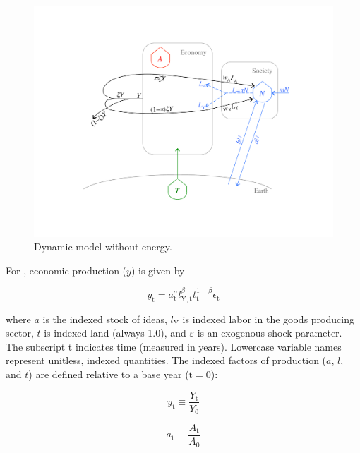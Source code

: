\documentclass[letterpaper,12pt]{article}
\begin{document}
\begin{figure} \label{fig:ModelWithoutEnergy}
  \begin{center}
    \includegraphics[width=\textwidth]{figure_other/ModelWithoutEnergy.pdf}
    \caption{Dynamic model without energy.}
  \end{center}
\end{figure}

For \citet{Jones:2001wn}, economic production ($y$) is given by

\begin{equation} \label{eq:Jones_production_function}
	y_\mathrm{t} = a_\mathrm{t} ^\sigma l_\mathrm{Y,t} ^\beta t_\mathrm{t} ^{1-\beta} \epsilon_\mathrm{t}
\end{equation}

\noindent where $a$ is the indexed stock of ideas, $l_\mathrm{Y}$ is indexed labor in the goods producing sector, $t$ is indexed land (always 1.0), and $\varepsilon$ is an exogenous shock parameter. The subscript t indicates time (measured in years). Lowercase variable names represent unitless, indexed quantities. The indexed factors of production ($a$, $l$, and $t$) are defined relative to a base year ($\mathrm{t} = 0$):

\begin{equation} \label{eq:index_y}
	y_\mathrm{t} \equiv \frac{Y_\mathrm{t}}{Y_\mathrm{0}}
\end{equation}

\begin{equation} \label{eq:index_a}
	a_\mathrm{t} \equiv \frac{A_\mathrm{t}}{A_\mathrm{0}}
\end{equation}
\end{document}
